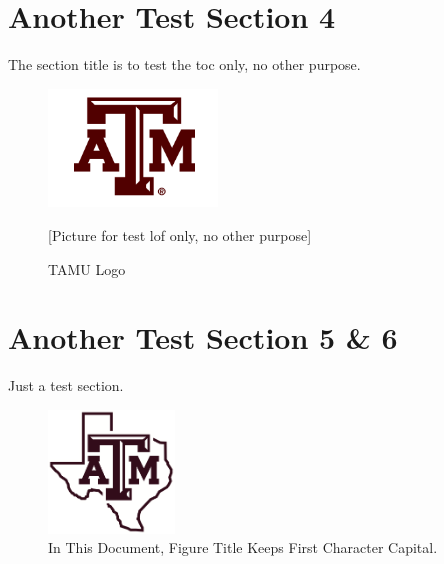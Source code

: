 \section{Another Test Section 4}

The section title is to test the toc only, no other purpose.
 \begin{figure}[!htbp]
\begin{center}
\includegraphics[width=0.4\textwidth]{graphic/TAM_Logo1.png}
\caption{TAMU Logo}
\label{fig:testExample1}
[Picture for test lof only, no other purpose]
\end{center}
\end{figure}
 
\section{Another Test Section 5 \& 6}

Just a test section. 
\begin{figure}[!hbp]
\begin{center}
\includegraphics[width=0.3\textwidth]{graphic/LoneStarLogo_WhiteTexas.png}
\caption{In This Document, Figure Title Keeps First Character Capital.}
\label{fig:testExample3}
\end{center}
\end{figure}

